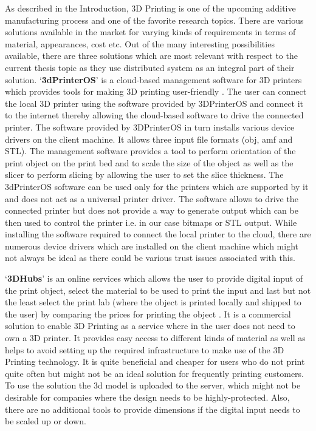 As described in the Introduction, 3D Printing is one of the upcoming additive manufacturing process and one of the favorite research topics. There are various solutions available in the market for varying kinds of requirements in terms of material, appearances, cost etc. Out of the many interesting possibilities available, there are three solutions which are most relevant with respect to the current thesis topic as they use distributed system as an integral part of their solution. {\lq}\textbf{3dPrinterOS}{\rq} is a cloud-based management software for 3D printers which provides tools for making 3D printing user-friendly \cite{3dprinteros}. The user can connect the local 3D printer using the software provided by 3DPrinterOS and connect it to the internet thereby allowing the cloud-based software to drive the connected printer. The software provided by 3DPrinterOS in turn installs various device drivers on the client machine. It allows three input file formats (obj, amf and STL). The management software provides a tool to perform orientation of the print object on the print bed and to scale the size of the object as well as the slicer to perform slicing by allowing the user to set the slice thickness. The 3dPrinterOS software can be used only for the printers which are supported by it and does not act as a universal printer driver. The software allows to drive the connected printer but does not provide a way to generate output which can be then used to control the printer i.e. in our case bitmaps or STL output. While installing the software required to connect the local printer to the cloud, there are numerous device drivers which are installed on the client machine which might not always be ideal as there could be various trust issues associated with this. \newline

{\lq}\textbf{3DHubs}{\rq} is an online services which allows the user to provide digital input of the print object, select the material to be used to print the input and last but not the least select the print lab (where the object is printed locally and shipped to the user) by comparing the prices for printing the object \cite{3dhub}. It is a commercial solution to enable 3D Printing as a service where in the user does not need to own a 3D printer. It provides easy access to different kinds of material as well as helps to avoid setting up the required infrastructure to make use of the 3D Printing technology. It is quite beneficial and cheaper for users who do not print quite often but might not be an ideal solution for frequently printing customers. To use the solution the 3d model is uploaded to the server, which might not be desirable for companies where the design needs to be highly-protected. Also, there are no additional tools to provide dimensions if the digital input needs to be scaled up or down. \newline     

